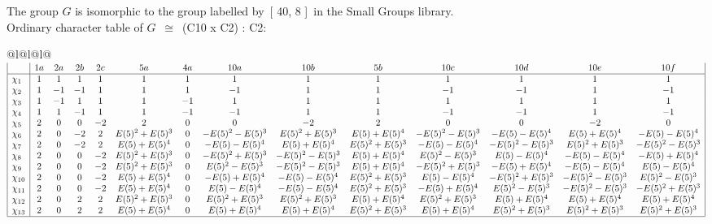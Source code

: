 \documentclass[varwidth=\maxdimen,border=10]{standalone}
\begin{document}
The group $G$ is isomorphic to the group labelled by\ [ 40, 8 ]\ in the Small Groups library.\\
Ordinary character table of $G$\ $\cong$\ (C10 x C2) : C2:\\
\begin{center}
\begin{tabular}{@{}l@{}l@{}l@{}}
\hline
\(\begin{array}{|l|ccccccccccccc|}
  & 1a & 2a & 2b & 2c & 5a & 4a & 10a & 10b & 5b & 10c & 10d & 10e & 10f\\ \hline
\chi_{1} & 1 & 1 & 1 & 1 & 1 & 1 & 1 & 1 & 1 & 1 & 1 & 1 & 1\\
\chi_{2} & 1 & -1 & -1 & 1 & 1 & 1 & -1 & 1 & 1 & -1 & -1 & 1 & -1\\
\chi_{3} & 1 & -1 & 1 & 1 & 1 & -1 & 1 & 1 & 1 & 1 & 1 & 1 & 1\\
\chi_{4} & 1 & 1 & -1 & 1 & 1 & -1 & -1 & 1 & 1 & -1 & -1 & 1 & -1\\
\chi_{5} & 2 & 0 & 0 & -2 & 2 & 0 & 0 & -2 & 2 & 0 & 0 & -2 & 0\\
\chi_{6} & 2 & 0 & -2 & 2 & E(5)^{2}+E(5)^{3} & 0 & -E(5)^{2}-E(5)^{3} & E(5)^{2}+E(5)^{3} & E(5)+E(5)^{4} & -E(5)^{2}-E(5)^{3} & -E(5)-E(5)^{4} & E(5)+E(5)^{4} & -E(5)-E(5)^{4}\\
\chi_{7} & 2 & 0 & -2 & 2 & E(5)+E(5)^{4} & 0 & -E(5)-E(5)^{4} & E(5)+E(5)^{4} & E(5)^{2}+E(5)^{3} & -E(5)-E(5)^{4} & -E(5)^{2}-E(5)^{3} & E(5)^{2}+E(5)^{3} & -E(5)^{2}-E(5)^{3}\\
\chi_{8} & 2 & 0 & 0 & -2 & E(5)^{2}+E(5)^{3} & 0 & -E(5)^{2}+E(5)^{3} & -E(5)^{2}-E(5)^{3} & E(5)+E(5)^{4} & E(5)^{2}-E(5)^{3} & E(5)-E(5)^{4} & -E(5)-E(5)^{4} & -E(5)+E(5)^{4}\\
\chi_{9} & 2 & 0 & 0 & -2 & E(5)^{2}+E(5)^{3} & 0 & E(5)^{2}-E(5)^{3} & -E(5)^{2}-E(5)^{3} & E(5)+E(5)^{4} & -E(5)^{2}+E(5)^{3} & -E(5)+E(5)^{4} & -E(5)-E(5)^{4} & E(5)-E(5)^{4}\\
\chi_{10} & 2 & 0 & 0 & -2 & E(5)+E(5)^{4} & 0 & -E(5)+E(5)^{4} & -E(5)-E(5)^{4} & E(5)^{2}+E(5)^{3} & E(5)-E(5)^{4} & -E(5)^{2}+E(5)^{3} & -E(5)^{2}-E(5)^{3} & E(5)^{2}-E(5)^{3}\\
\chi_{11} & 2 & 0 & 0 & -2 & E(5)+E(5)^{4} & 0 & E(5)-E(5)^{4} & -E(5)-E(5)^{4} & E(5)^{2}+E(5)^{3} & -E(5)+E(5)^{4} & E(5)^{2}-E(5)^{3} & -E(5)^{2}-E(5)^{3} & -E(5)^{2}+E(5)^{3}\\
\chi_{12} & 2 & 0 & 2 & 2 & E(5)^{2}+E(5)^{3} & 0 & E(5)^{2}+E(5)^{3} & E(5)^{2}+E(5)^{3} & E(5)+E(5)^{4} & E(5)^{2}+E(5)^{3} & E(5)+E(5)^{4} & E(5)+E(5)^{4} & E(5)+E(5)^{4}\\
\chi_{13} & 2 & 0 & 2 & 2 & E(5)+E(5)^{4} & 0 & E(5)+E(5)^{4} & E(5)+E(5)^{4} & E(5)^{2}+E(5)^{3} & E(5)+E(5)^{4} & E(5)^{2}+E(5)^{3} & E(5)^{2}+E(5)^{3} & E(5)^{2}+E(5)^{3}\\
\hline
\end{array}\)\\
\end{tabular}
\end{center}
\end{document}
